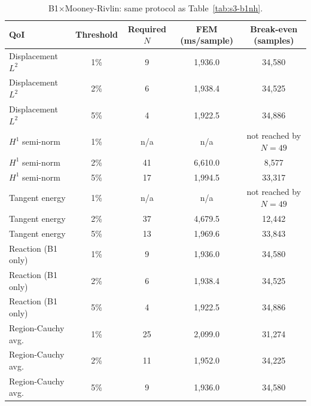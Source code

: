 \documentclass[11pt]{article}
\begin{document}
\begin{table}[h]
\centering
\caption{B1$\times$Mooney-Rivlin: same protocol as Table~\ref{tab:s3-b1nh}.}
\label{tab:s3-b1mr}
\small
\begin{tabular}{lcccc}
\toprule
QoI & Threshold & Required $N$ & FEM (ms/sample) & Break-even (samples) \\
\midrule
Displacement $L^2$  & 1\% & 9   & 1{,}936.0 & 34{,}580 \\
Displacement $L^2$  & 2\% & 6   & 1{,}938.4 & 34{,}525 \\
Displacement $L^2$  & 5\% & 4   & 1{,}922.5 & 34{,}886 \\
$H^1$ semi-norm     & 1\% & n/a & n/a       & not reached by $N{=}49$ \\
$H^1$ semi-norm     & 2\% & 41  & 6{,}610.0 & 8{,}577 \\
$H^1$ semi-norm     & 5\% & 17  & 1{,}994.5 & 33{,}317 \\
Tangent energy      & 1\% & n/a & n/a       & not reached by $N{=}49$ \\
Tangent energy      & 2\% & 37  & 4{,}679.5 & 12{,}442 \\
Tangent energy      & 5\% & 13  & 1{,}969.6 & 33{,}843 \\
Reaction (B1 only)  & 1\% & 9   & 1{,}936.0 & 34{,}580 \\
Reaction (B1 only)  & 2\% & 6   & 1{,}938.4 & 34{,}525 \\
Reaction (B1 only)  & 5\% & 4   & 1{,}922.5 & 34{,}886 \\
Region-Cauchy avg.\ & 1\% & 25  & 2{,}099.0 & 31{,}274 \\
Region-Cauchy avg.\ & 2\% & 11  & 1{,}952.0 & 34{,}225 \\
Region-Cauchy avg.\ & 5\% & 9   & 1{,}936.0 & 34{,}580 \\
\bottomrule
\end{tabular}
\end{table}
\end{document}
